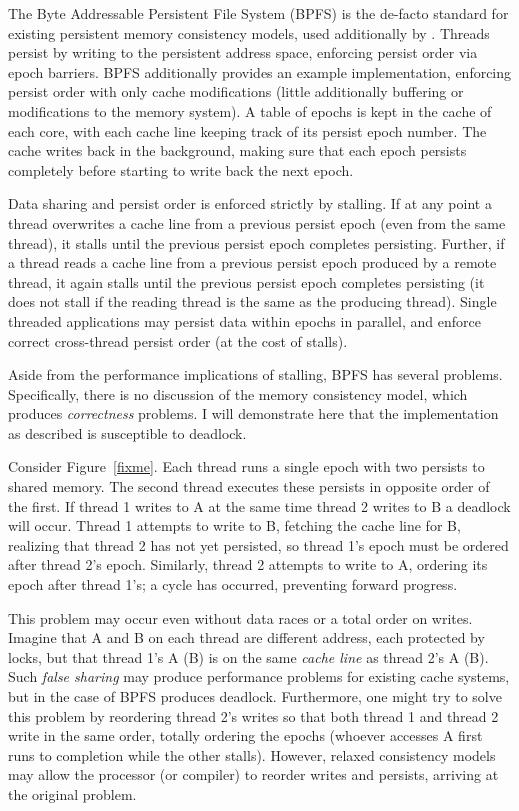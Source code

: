 The Byte Addressable Persistent File System (BPFS)  is the de-facto standard for existing persistent memory consistency models, used additionally by .
Threads persist by writing to the persistent address space, enforcing persist order via epoch barriers.
BPFS additionally provides an example implementation, enforcing persist order with only cache modifications (little additionally buffering or modifications to the memory system).
A table of epochs is kept in the cache of each core, with each cache line keeping track of its persist epoch number.
The cache writes back in the background, making sure that each epoch persists completely before starting to write back the next epoch.

Data sharing and persist order is enforced strictly by stalling.
If at any point a thread overwrites a cache line from a previous persist epoch (even from the same thread), it stalls until the previous persist epoch completes persisting.
Further, if a thread reads a cache line from a previous persist epoch produced by a remote thread, it again stalls until the previous persist epoch completes persisting (it does not stall if the reading thread is the same as the producing thread).
Single threaded applications may persist data within epochs in parallel, and enforce correct cross-thread persist order (at the cost of stalls).

Aside from the performance implications of stalling, BPFS has several problems.
Specifically, there is no discussion of the memory consistency model, which produces \emph{correctness} problems.
I will demonstrate here that the implementation as described is susceptible to deadlock.

Consider Figure~\ref{fixme}.
Each thread runs a single epoch with two persists to shared memory.
The second thread executes these persists in opposite order of the first.
If thread 1 writes to A at the same time thread 2 writes to B a deadlock will occur.
Thread 1 attempts to write to B, fetching the cache line for B, realizing that thread 2 has not yet persisted, so thread 1's epoch must be ordered after thread 2's epoch.
Similarly, thread 2 attempts to write to A, ordering its epoch after thread 1's; a cycle has occurred, preventing forward progress.

This problem may occur even without data races or a total order on writes.
Imagine that A and B on each thread are different address, each protected by locks, but that thread 1's A (B) is on the same \emph{cache line} as thread 2's A (B).
Such \emph{false sharing} may produce performance problems for existing cache systems, but in the case of BPFS produces deadlock.
Furthermore, one might try to solve this problem by reordering thread 2's writes so that both thread 1 and thread 2 write in the same order, totally ordering the epochs (whoever accesses A first runs to completion while the other stalls).
However, relaxed consistency models may allow the processor (or compiler) to reorder writes and persists, arriving at the original problem.


